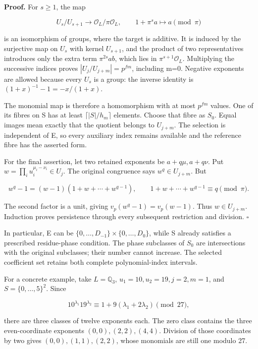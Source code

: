 \documentclass[
  11pt,
  a4paper,
]{article}
\begin{document}
\textbf{Proof.} For \(s\ge1\), the map

\[
U_s/U_{s+1}\longrightarrow\mathcal O_L/\pi\mathcal O_L,
\qquad 1+\pi^s a\longmapsto a\pmod\pi
\tag{10.662}
\]

is an isomorphism of groups, where the target is additive. It is induced
by the surjective map on \(U_s\) with kernel \(U_{s+1}\), and the
product of two representatives introduces only the extra term
\(\pi^{2s}ab\), which lies in \(\pi^{s+1}\mathcal O_L\). Multiplying the
successive indices proves \(|U_j/U_{j+m}|=p^{fm}\), including m=0.
Negative exponents are allowed because every \(U_s\) is a group: the
inverse identity is \((1+x)^{-1}-1=-x/(1+x)\).

The monomial map is therefore a homomorphism with at most \(p^{fm}\)
values. One of its fibres on S has at least \(\lceil|S|/h_m\rceil\)
elements. Choose that fibre as \(S_0\). Equal images mean exactly that
the quotient belongs to \(U_{j+m}\). The selection is independent of E,
so every auxiliary index remains available and the reference fibre has
the asserted form.

For the final assertion, let two retained exponents be
\(a+q\mu,a+q\nu\). Put \(w=\prod_i u_i^{\mu_i-\nu_i}\in U_j\). The
original congruence says \(w^q\in U_{j+m}\). But

\[
w^q-1=(w-1)(1+w+\cdots+w^{q-1}),
\qquad 1+w+\cdots+w^{q-1}\equiv q\pmod\pi.
\tag{10.663}
\]

The second factor is a unit, giving \(v_p(w^q-1)=v_p(w-1)\). Thus
\(w\in U_{j+m}\). Induction proves persistence through every subsequent
restriction and division. \(\square\)

In particular, E can be \(\{0,\ldots,D_{-1}\}\times\{0,\ldots,D_0\}\),
while S already satisfies a prescribed residue-phase condition. The
phase subclasses of \(S_0\) are intersections with the original
subclasses; their number cannot increase. The selected coefficient set
retains both complete polynomial-index intervals.

For a concrete example, take \(L=\mathbb Q_3\),
\(u_1=10,u_2=19,j=2,m=1\), and \(S=\{0,\ldots,5\}^2\). Since

\[
10^{\lambda_1}19^{\lambda_2}
\equiv1+9(\lambda_1+2\lambda_2)\pmod{27},
\tag{10.664}
\]

there are three classes of twelve exponents each. The zero class
contains the three even-coordinate exponents \((0,0),(2,2),(4,4)\).
Division of those coordinates by two gives \((0,0),(1,1),(2,2)\), whose
monomials are still one modulo 27.
\end{document}
